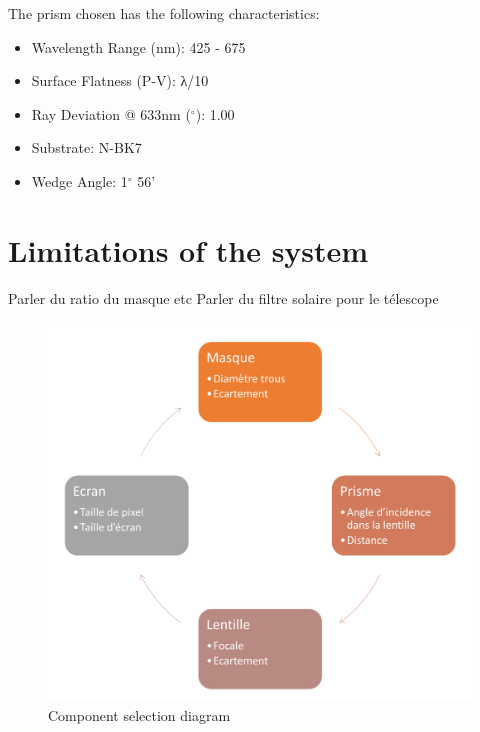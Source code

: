 The prism chosen has the following characteristics:
\begin{itemize}
    \item Wavelength Range (nm): 425 - 675
    \item Surface Flatness (P-V): λ/10
    \item Ray Deviation @ 633nm ($^{\circ}$): 1.00
    \item Substrate: N-BK7
    \item Wedge Angle: 1$^{\circ}$ 56'
\end{itemize}
\newpage
\section{Limitations of the system}\label{sec:Opti_Limit}
Parler du ratio du masque etc \newline
Parler du filtre solaire pour le télescope

\begin{figure}[H]
    \centering
    \includegraphics[scale=0.25]{assets/figures/Optical Design/Diagramme_Limitation.png}
    \caption{Component selection diagram}
    \label{fig:Opti_DiagrammChoices}
\end{figure}